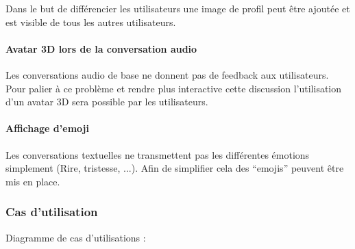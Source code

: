 \par Dans le but de différencier les utilisateurs une image de profil peut être ajoutée et est visible de tous les autres utilisateurs.

\paragraph{Avatar 3D lors de la conversation audio\newline}

\par Les conversations audio de base ne donnent pas de feedback aux utilisateurs. Pour palier à ce problème et rendre plus interactive cette discussion l’utilisation d’un avatar 3D sera possible par les utilisateurs.

\paragraph{Affichage d’emoji\newline}

\par Les conversations textuelles ne transmettent pas les différentes émotions simplement (Rire, tristesse, ...). Afin de simplifier cela des “emojis” peuvent être mis en place. 

\newpage
\subsubsection{Cas d’utilisation}

Diagramme de cas d'utilisations : \newline


